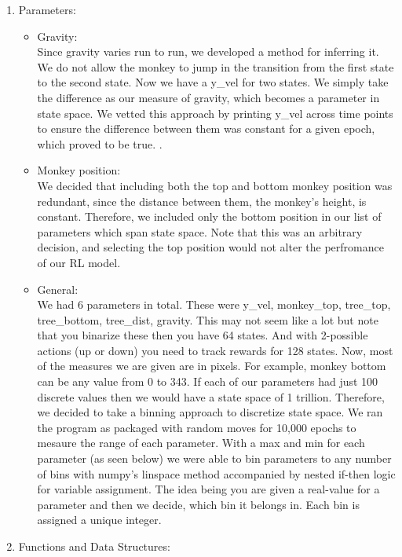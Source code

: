 \documentclass[12pt]{article}
\newcommand\tab[1][0.5cm]{\hspace*{#1}}
\begin{document}
\begin{enumerate}
\item
Parameters: 
    \begin{itemize}
        \item Gravity: \\
            \tab Since gravity varies run to run, we developed a method for inferring it.  We do not allow the monkey to jump in the transition from the first state to the second state.  Now we have a y\_vel for two states.  We simply take the difference as our measure of gravity, which becomes a parameter in state space.  We vetted this approach by printing y\_vel across time points to ensure the difference between them was constant for a given epoch, which proved to be true.  
            . 
        \item Monkey position:\\
            \tab We decided that including both the top and bottom monkey position was redundant, since the distance between them, the monkey's height, is constant.  Therefore, we included only the bottom position in our list of parameters which span state space.  Note that this was an arbitrary decision, and selecting the top position would not alter the perfromance of our RL model. 
            
        \item General: \\
            \tab We had 6 parameters in total.  These were y\_vel, monkey\_top, tree\_top, tree\_bottom, tree\_dist, gravity.  This may not seem like a lot but note that you binarize these then you have 64 states.  And with 2-possible actions (up or down) you need to track rewards for 128 states.  Now, most of the measures we are given are in pixels.  For example, monkey bottom can be any value from 0 to 343.  If each of our parameters had just 100 discrete values then we would have a state space of 1 trillion.  Therefore, we decided to take a binning approach to discretize state space.  We ran the program as packaged with random moves for 10,000 epochs to mesaure the range of each parameter.  With a max and min for each parameter (as seen below) we were able to bin parameters to any number of bins with numpy's linspace method accompanied by nested if-then logic for variable assignment.  The idea being you are given a real-value for a parameter and then we decide, which bin it belongs in.  Each bin is assigned a unique integer.
   \end{itemize}

\item
Functions and Data Structures:


\end{enumerate}
\end{document}
